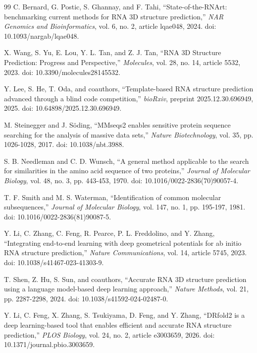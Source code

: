 \begin{thebibliography}{99}
C. Bernard, G. Postic, S. Ghannay, and F. Tahi,
``State-of-the-RNArt: benchmarking current methods for RNA 3D structure prediction,''
\emph{NAR Genomics and Bioinformatics}, vol. 6, no. 2, article lqae048, 2024.
doi: 10.1093/nargab/lqae048.

X. Wang, S. Yu, E. Lou, Y. L. Tan, and Z. J. Tan,
``RNA 3D Structure Prediction: Progress and Perspective,''
\emph{Molecules}, vol. 28, no. 14, article 5532, 2023.
doi: 10.3390/molecules28145532.

Y. Lee, S. He, T. Oda, and coauthors,
``Template-based RNA structure prediction advanced through a blind code competition,''
\emph{bioRxiv}, preprint 2025.12.30.696949, 2025.
doi: 10.64898/2025.12.30.696949.

M. Steinegger and J. S\"oding,
``MMseqs2 enables sensitive protein sequence searching for the analysis of massive data sets,''
\emph{Nature Biotechnology}, vol. 35, pp. 1026-1028, 2017.
doi: 10.1038/nbt.3988.

S. B. Needleman and C. D. Wunsch,
``A general method applicable to the search for similarities in the amino acid sequence of two proteins,''
\emph{Journal of Molecular Biology}, vol. 48, no. 3, pp. 443-453, 1970.
doi: 10.1016/0022-2836(70)90057-4.

T. F. Smith and M. S. Waterman,
``Identification of common molecular subsequences,''
\emph{Journal of Molecular Biology}, vol. 147, no. 1, pp. 195-197, 1981.
doi: 10.1016/0022-2836(81)90087-5.

Y. Li, C. Zhang, C. Feng, R. Pearce, P. L. Freddolino, and Y. Zhang,
``Integrating end-to-end learning with deep geometrical potentials for ab initio RNA structure prediction,''
\emph{Nature Communications}, vol. 14, article 5745, 2023.
doi: 10.1038/s41467-023-41303-9.

T. Shen, Z. Hu, S. Sun, and coauthors,
``Accurate RNA 3D structure prediction using a language model-based deep learning approach,''
\emph{Nature Methods}, vol. 21, pp. 2287-2298, 2024.
doi: 10.1038/s41592-024-02487-0.

Y. Li, C. Feng, X. Zhang, S. Tsukiyama, D. Feng, and Y. Zhang,
``DRfold2 is a deep learning-based tool that enables efficient and accurate RNA structure prediction,''
\emph{PLOS Biology}, vol. 24, no. 2, article e3003659, 2026.
doi: 10.1371/journal.pbio.3003659.


\end{thebibliography}

